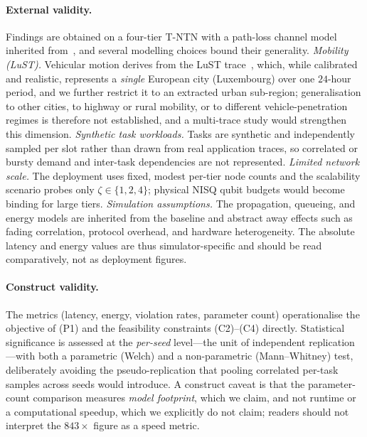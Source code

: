 \documentclass[11pt,a4paper]{article}
\theoremstyle{definition}
\begin{document}
\paragraph{External validity.}
Findings are obtained on a four-tier T-NTN with a path-loss channel model inherited from~\cite{hrl_ntn}, and several modelling choices bound their generality. \emph{Mobility (LuST).} Vehicular motion derives from the LuST trace~\cite{codeca2015lust}, which, while calibrated and realistic, represents a \emph{single} European city (Luxembourg) over one $24$-hour period, and we further restrict it to an extracted urban sub-region; generalisation to other cities, to highway or rural mobility, or to different vehicle-penetration regimes is therefore not established, and a multi-trace study would strengthen this dimension. \emph{Synthetic task workloads.} Tasks are synthetic and independently sampled per slot rather than drawn from real application traces, so correlated or bursty demand and inter-task dependencies are not represented. \emph{Limited network scale.} The deployment uses fixed, modest per-tier node counts and the scalability scenario probes only $\zeta\in\{1,2,4\}$; physical NISQ qubit budgets would become binding for large tiers. \emph{Simulation assumptions.} The propagation, queueing, and energy models are inherited from the baseline and abstract away effects such as fading correlation, protocol overhead, and hardware heterogeneity. The absolute latency and energy values are thus simulator-specific and should be read comparatively, not as deployment figures.

\paragraph{Construct validity.}
The metrics (latency, energy, violation rates, parameter count) operationalise the objective of (P1) and the feasibility constraints (C2)--(C4) directly. Statistical significance is assessed at the \emph{per-seed} level---the unit of independent replication---with both a parametric (Welch) and a non-parametric (Mann--Whitney) test, deliberately avoiding the pseudo-replication that pooling correlated per-task samples across seeds would introduce. A construct caveat is that the parameter-count comparison measures \emph{model footprint}, which we claim, and not runtime or a computational speedup, which we explicitly do not claim; readers should not interpret the $843\times$ figure as a speed metric.
\end{document}
